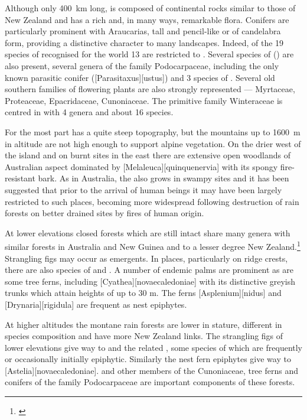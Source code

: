 Although only \SI{400}{\kilo\metre} long,  is composed of continental rocks similar to those of New Zealand and has a rich and, in many ways, remarkable flora.
Conifers are particularly prominent with Araucarias, tall and pencil-like or of candelabra form, providing a distinctive character to many landscapes.
Indeed, of the 19 species of  recognised for the world 13 are restricted to .
Several species of  () are also present, several genera of the family Podocarpaceae, including the only known parasitic conifer ([Parasitaxus][ustus]) and 3 species of .
Several old southern families of flowering plants are also strongly represented --- Myrtaceae, Proteaceae, Epacridaceae, Cunoniaceae.
The primitive family Winteraceae is centred in  with 4 genera and about 16 species.

For the most part  has a quite steep topography, but the mountains up to \SI{1600}{\metre} in altitude are not high enough to support alpine vegetation.
On the drier west of the island and on burnt sites in the east there are extensive open woodlands of Australian aspect dominated by [Melaleuca][quinquenervia] with its spongy fire-resistant bark.
As in Australia, the  also grows in swampy sites and it has been suggested that prior to the arrival of human beings it may have been largely restricted to such places, becoming more widespread following destruction of rain forests on better drained sites by fires of human origin.

At lower elevations closed forests which are still intact share many genera with similar forests in Australia and New Guinea and to a lesser degree New Zealand.\footnote{\cite{morat1986floristic}}
Strangling figs may occur as emergents.
In places, particularly on ridge crests, there are also species of  and .
A number of endemic palms are prominent as are some tree ferns, including [Cyathea][novaecaledoniae] with its distinctive greyish trunks which attain heights of up to 30 m.
The ferns [Asplenium][nidus] and [Drynaria][rigidula] are frequent as nest epiphytes.

At higher altitudes the montane rain forests are lower in stature, different in species composition and have more New Zealand links.
The strangling figs of lower elevations give way to  and the related , some species of which are frequently or occasionally initially epiphytic.
Similarly the nest fern epiphytes give way to [Astelia][novaecaledoniae].  and other members of the Cunoniaceae, tree ferns and conifers of the family Podocarpaceae are important components of these forests.

